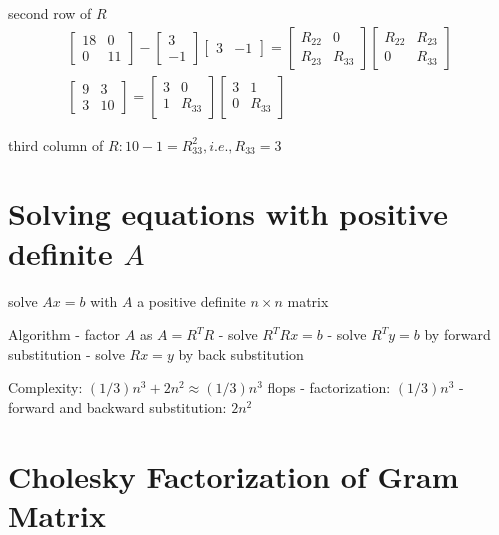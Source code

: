 \begin{example}
second row of $ R $
$$
\begin{array}{c}
{\left[\begin{array}{rr}
18 & 0 \\
0 & 11
\end{array}\right]-\left[\begin{array}{r}
3 \\
-1
\end{array}\right]\left[\begin{array}{ll}
3 & -1
\end{array}\right]=\left[\begin{array}{cc}
R_{22} & 0 \\
R_{23} & R_{33}
\end{array}\right]\left[\begin{array}{cc}
R_{22} & R_{23} \\
0 & R_{33}
\end{array}\right]} \\
{\left[\begin{array}{rr}
9 & 3 \\
3 & 10
\end{array}\right]=\left[\begin{array}{cc}
3 & 0 \\
1 & R_{33}
\end{array}\right]\left[\begin{array}{cc}
3 & 1 \\
0 & R_{33}
\end{array}\right]}
\end{array}
$$

third column of $ R: 10-1=R_{33}^{2}, i . e ., R_{33}=3 $
\end{example}

\section{Solving equations with positive definite $A$}

solve $ A x=b $ with $ A $ a positive definite $ n \times n $ matrix

Algorithm
- factor $ A $ as $ A=R^{T} R $
- solve $ R^{T} R x=b $
- solve $ R^{T} y=b $ by forward substitution
- solve $ R x=y $ by back substitution

Complexity: $ (1 / 3) n^{3}+2 n^{2} \approx(1 / 3) n^{3} $ flops
- factorization: $ (1 / 3) n^{3} $
- forward and backward substitution: $ 2 n^{2} $

\section{Cholesky Factorization of Gram Matrix}

